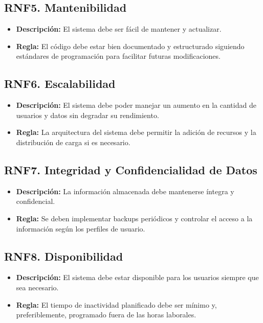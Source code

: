 \documentclass{article}
\begin{document}
\subsection{RNF5. Mantenibilidad}
\begin{itemize}
    \item \textbf{Descripción:} El sistema debe ser fácil de mantener y actualizar.
    \item \textbf{Regla:} El código debe estar bien documentado y estructurado siguiendo estándares de programación para facilitar futuras modificaciones.
\end{itemize}

\subsection{RNF6. Escalabilidad}
\begin{itemize}
    \item \textbf{Descripción:} El sistema debe poder manejar un aumento en la cantidad de usuarios y datos sin degradar su rendimiento.
    \item \textbf{Regla:} La arquitectura del sistema debe permitir la adición de recursos y la distribución de carga si es necesario.
\end{itemize}

\subsection{RNF7. Integridad y Confidencialidad de Datos}
\begin{itemize}
    \item \textbf{Descripción:} La información almacenada debe mantenerse íntegra y confidencial.
    \item \textbf{Regla:} Se deben implementar backups periódicos y controlar el acceso a la información según los perfiles de usuario.
\end{itemize}

\subsection{RNF8. Disponibilidad}
\begin{itemize}
    \item \textbf{Descripción:} El sistema debe estar disponible para los usuarios siempre que sea necesario.
    \item \textbf{Regla:} El tiempo de inactividad planificado debe ser mínimo y, preferiblemente, programado fuera de las horas laborales.
\end{itemize}
\end{document}
